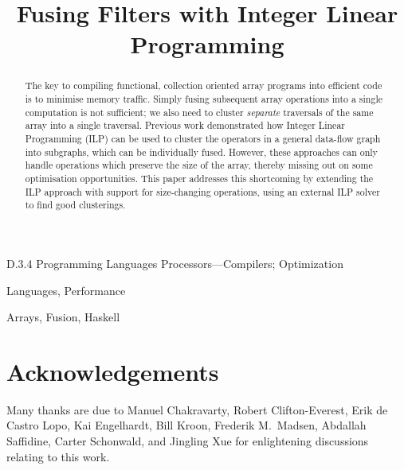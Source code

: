 \documentclass[preprint]{sigplanconf}
\begin{document}
\exclusivelicense
{}


\title{Fusing Filters with Integer Linear Programming}


\maketitle
\makeatactive

\begin{abstract}
The key to compiling functional, collection oriented array programs into efficient code is to minimise memory traffic.
Simply fusing subsequent array operations into a single computation is not sufficient; we also need to cluster \emph{separate} traversals of the same array into a single traversal.
Previous work demonstrated how Integer Linear Programming (ILP) can be used to cluster the operators in a general data-flow graph into subgraphs, which can be individually fused.
However, these approaches can only handle operations which preserve the size of the array, thereby missing out on some optimisation opportunities.
This paper addresses this shortcoming by extending the ILP approach with support for size-changing operations, using an external ILP solver to find good clusterings.
\end{abstract}


\category
	{D.3.4}
	{Programming Languages}
	{Processors---Compilers; Optimization}

\terms
	Languages, Performance

\keywords
	Arrays, Fusion, Haskell







% 


\section*{Acknowledgements}
Many thanks are due to
Manuel Chakravarty,
Robert Clifton-Everest,
Erik de Castro Lopo,
Kai Engelhardt,
Bill Kroon,
Frederik M.\ Madsen,
Abdallah Saffidine,
Carter Schonwald,
and Jingling Xue
for enlightening discussions relating to this work.



\end{document}
